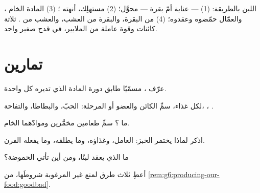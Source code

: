 \begin{example}\label{ex:g6:producing-our-food:breakfast}
اللبن بالطريقة: (1)  ---  عناية أمّ بقرة --- محوَّل؛ (2)
 مستهلِك، أنهته ؛ (3) المادة الخام ، والعمّال
حمّضوه وعقدوه؛ (4)  من البقرة، والبقرة من العشب، والعشب من
. ثلاثة كائنات وقوة عاملة من الملايير، في قدح صغير واحد.
\end{example}

\section{تمارين}

\begin{exercise}[$\star$]\label{exo:g6:producing-our-food:1}
عرّف  ، مسمّيًا طابق دورة المادة الذي
تديره كل واحدة.
\end{exercise}

\begin{exercise}[$\star$]\label{exo:g6:producing-our-food:2}
لكل غذاء، سمِّ الكائن والعضو أو المرحلة: الحبّ، والبطاطا،
والتفاحة، ، .
\end{exercise}

\begin{exercise}[$\star$]\label{exo:g6:producing-our-food:3}
ما ؟ سمِّ طعامين مخمَّرين وموادّهما الخام.
\end{exercise}

\begin{exercise}[$\star$]\label{exo:g6:producing-our-food:4}
اذكر لماذا يختمر الخبز: العامل، وغذاؤه، وما يطلقه، وما يفعله
الفرن.
\end{exercise}

\begin{exercise}[$\star$]\label{exo:g6:producing-our-food:5}
ما الذي يعقد  لبنًا، ومن أين تأتي الحموضة؟
\end{exercise}

\begin{exercise}[$\star$]\label{exo:g6:producing-our-food:6}
أعطِ ثلاث طرق لمنع  غير المرغوبة شروطَها، من
\cref{rem:g6:producing-our-food:goodbad}.
\end{exercise}

